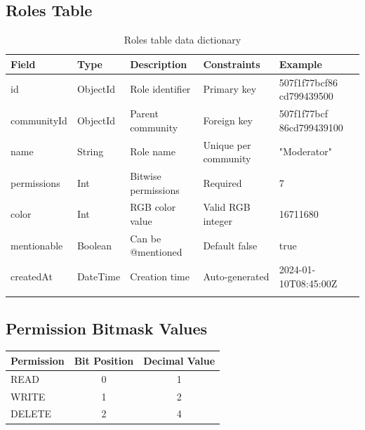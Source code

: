 \subsection{Roles Table}
\begin{longtable}{|L{3cm}|C{2cm}|L{2.5cm}|L{3cm}|L{3cm}|}
\hline
\textbf{Field} & \textbf{Type} & \textbf{Description} & \textbf{Constraints} & \textbf{Example} \\ \hline
\endhead

id & ObjectId & Role identifier & Primary key & 507f1f77bcf86 cd799439500 \\ \hline
communityId & ObjectId & Parent community & Foreign key & 507f1f77bcf 86cd799439100 \\ \hline
name & String & Role name & Unique per community & "Moderator" \\ \hline
permissions & Int & Bitwise permissions & Required & 7 \\ \hline
color & Int & RGB color value & Valid RGB integer & 16711680 \\ \hline
mentionable & Boolean & Can be @mentioned & Default false & true \\ \hline
createdAt & DateTime & Creation time & Auto-generated & 2024-01-10T08:45:00Z \\ \hline

\caption{Roles table data dictionary}
\label{tab:roles_dict}
\end{longtable}

\subsection{Permission Bitmask Values}
\begin{center}
\begin{tabular}{|l|c|c|}
\hline
\textbf{Permission} & \textbf{Bit Position} & \textbf{Decimal Value} \\ \hline
READ & 0 & 1 \\ \hline
WRITE & 1 & 2 \\ \hline
DELETE & 2 & 4 \\ \hline
\end{tabular}
\end{center}

